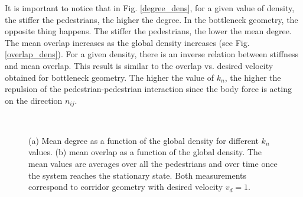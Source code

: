 \documentclass[preprint,12pt]{elsarticle}
\begin{document}
It is important to notice that in Fig. \ref{degree_dens}, for a given value of density, the stiffer the pedestrians, the higher the degree. In the bottleneck geometry, the opposite thing happens. The stiffer the pedestrians, the lower the mean degree.
\\

The mean overlap increases as the global density increases (see Fig. \ref{overlap_dens}). For a given density, there is an inverse relation between stiffness and mean overlap. This result is similar to the overlap vs. desired velocity obtained for bottleneck geometry. The higher the value of $k_n$, the higher the repulsion of the pedestrian-pedestrian interaction since the body force is acting on the direction $n_{ij}$.\\

\begin{figure}[!htbp]
\centering
    \ 
    \\
\caption[width=0.47\columnwidth]{(a) Mean degree as a function of the global density for different $k_n$ values. (b) mean overlap as a function of the global density. The mean values are averages over all the pedestrians and over time once the system reaches the stationary state. Both measurements correspond to corridor geometry with desired velocity $v_d=1$.}
\label{network_corridor}
\end{figure}
\end{document}

